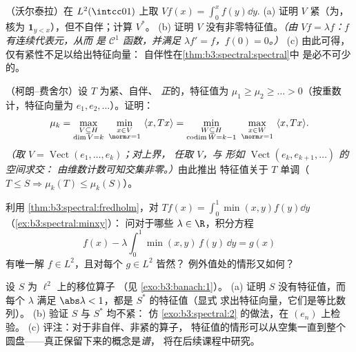 \begin{exercise}[$\star\star$]\label{exo:b3:spectral:7}
（沃尔泰拉）在 $L^2(\intcc01)$ 上取 $Vf(x) = \int_0^xf(y)\dd
y$.
(a) 证明 $V$ 紧（为，核为 $\mathbf
1_{y < x}$），但不自伴；计算 $V^*$。
(b) 证明 $V$ 没有非零特征值。\emph{（由 $Vf =
\lambda f$：$f$ 有连续代表元，从而
是 $\mathcal C^1$ 函数，并满足 $\lambda f' = f$，$f(0) = 0$。）}
(c) 由此可得，仅有紧性不足以给出特征向量：
自伴性在\cref{thm:b3:spectral:spectral}中
是必不可少的。
\end{exercise}

\begin{exercise}[$\star\star\star$]\label{exo:b3:spectral:8}
（柯朗–费舍尔）设 $T$ 为紧、自伴、
\emph{正}的，特征值为 $\mu_1 \geq \mu_2 \geq \dots
> 0$（按重数计，特征向量为 $e_1, e_2,
\dots$）。证明：
\[
\mu_{k} = \max_{\substack{V \subseteq H \\ \dim V = k}}\
\min_{\substack{x \in V\\ \norm x = 1}}\ \langle x, Tx\rangle
= \min_{\substack{W \subseteq H\\ \operatorname{codim}W =
k-1}}\ \max_{\substack{x\in W\\ \norm x = 1}}\ \langle x,
Tx\rangle .
\]
\emph{（取 $V = \operatorname{Vect}(e_1,\dots,e_k)$；对上界，
任取 $V$，与
形如 $\operatorname{Vect}(e_k, e_{k+1}, \dots)$ 的空间求交：
由维数计数可知交集非零。）}由此推出
特征值关于 $T$ 单调（$T \leq S
\Rightarrow \mu_k(T) \leq \mu_k(S)$）。
\end{exercise}

\begin{exercise}[$\star\star$]\label{exo:b3:spectral:9}
利用 \cref{thm:b3:spectral:fredholm}，对 $Tf(x) =
\int_0^1\min(x,y)f(y)\dd y$（\cref{ex:b3:spectral:minxy}）：
问对于哪些 $\lambda \in \R$，积分方程
\[
f(x) - \lambda\int_0^1\min(x,y)\,f(y)\,\dd y = g(x)
\]
有唯一解 $f \in L^2$，且对每个 $g \in L^2$ 皆然？
例外值处的情形又如何？
\end{exercise}

\begin{exercise}[$\star\star\star$]\label{exo:b3:spectral:10}
设 $S$ 为 $\ell^2$ 上的移位算子
（见 \cref{exo:b3:banach:1}）。
(a) 证明 $S$ 没有特征值，而每个 $\lambda$
满足 $\abs\lambda < 1$，都是 $S^*$ 的特征值（显式
求出特征向量，它们是等比数列）。
(b) 验证 $S$ 与 $S^*$ 均不紧：
仿 \cref{exo:b3:spectral:2} 的做法，在 $(e_n)$ 上检验。
(c) 评注：对于非自伴、非紧的算子，
特征值的情形可以从空集一直到整个
圆盘——真正保留下来的概念是\emph{谱}，
将在后续课程中研究。
\end{exercise}

